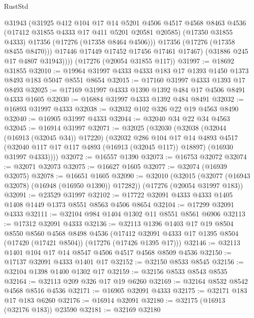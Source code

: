 \begin{lexlean}{RustStd}
\begin{coremodule}
              @31943
              (@31925
                @412
                @104
                @17
                @14
                @5201
                @4506
                @4517
                @4568
                @8463
                @4536
                (@17412 @31855 @4333 @17 @411 @5201 @20581 @20585)
                (@17350 @31855 @4333)
                @17356
                (@17276 (@17358 @8464 @4506)))
              @17356
              (@17276 (@17358 @8455 @8470)))
            @17446
            @17449
            @17452
            @17456
            @17461
            @17467)
          (@31886 @245 @17 @4807 @31943))))
    (@17276 (@20054 @31855 @117))
@31997 := @18692 @31855
@32010 := @19964 @31997 @4333 @4333 @183 @17 @1393 @1450 @1373 @8493 @183 @5047 @8551 @8654
@32015 := @17160 @31997 @4333 @1393 @17 @8493
@32025 := @17169 @31997 @4333 @1390 @1392 @484 @17 @4506 @8491 @4333 @1605
@32030 := @16884 @31997 @4333 @1392 @484 @8491
@32032 := @16893 @31997 @4333
@32038 := @32032 @102 @326 @22 @19 @4563 @8490
@32040 := @16905 @31997 @4333
@32044 := @32040 @34 @22 @34 @4563
@32045 := @16914 @31997
@32071 := @32025
    (@32030
      (@32038
        (@32044 (@16913 (@32045 @34)) @17220)
        (@32032
          @286
          @104
          @17
          @14
          @4893
          @4517
          (@32040 @117 @17 @117 @4893 (@16913 (@32045 @117)) @18897)
          (@16930 @31997 @4333))))
@32072 := @16557 @1390
@32073 := @16753 @32072
@32074 := @32071 @32073
@32075 := @16627 @1605
@32077 := @32074 (@16939 @32075)
@32078 := @16651 @1605
@32090 := @32010
    (@32015 (@32077 (@16943 @32078) (@16948 (@16950 @1390)) @17282))
    (@17276 (@20054 @31997 @183))
@32091 := @23529 @31997
@32102 := @17722 @32091 @4333 @4333 @1405 @1408 @1449 @1373 @8551 @8563 @4506 @8654
@32104 := @17299 @32091 @4333
@32111 := @32104 @984 @1404 @1302 @11 @8551 @8561 @6906
@32113 := @17312 @32091 @4333
@32136 := @32113
    @1396
    @1403
    @17
    @19
    @8504
    @8550
    @8560
    @4568
    @8498
    @4536
    (@17412 @32091 @4333 @17 @1395 @8504 (@17420 (@17421 @8504)) (@17276 (@17426 @1395 @17)))
@32146 := @32113 @1401 @104 @17 @14 @8547 @4506 @4517 @4568 @8509 @4536
@32150 := @17137 @32091 @4333 @1401 @17
@32152 := @32150 @8533 @8545
@32156 := @32104 @1398 @1400 @1302 @17
@32159 := @32156 @8533 @8543 @8535
@32164 := @32113 @209 @326 @17 @19 @6260
@32169 := @32164 @8532 @8542 @4568 @8516 @4536
@32171 := @16905 @32091 @4333
@32175 := @32171 @183 @17 @183 @6260
@32176 := @16914 @32091
@32180 := @32175 (@16913 (@32176 @183)) @23590
@32181 := @32169 @32180

\end{coremodule}
\end{lexlean}
